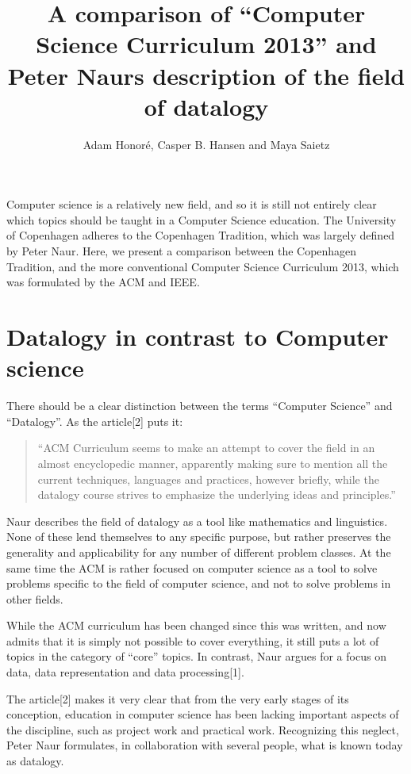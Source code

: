 \documentclass{article}
\title{A comparison of “Computer Science Curriculum 2013” and Peter Naurs description of the field of datalogy}
\author{Adam Honoré, Casper B. Hansen and Maya Saietz}
\begin{document}
\maketitle

\noindent Computer science is a relatively new field, and so it is still not entirely clear which topics should be taught in a
Computer Science education. The University of Copenhagen adheres to the Copenhagen Tradition, which was largely defined
by Peter Naur. Here, we present a comparison between the Copenhagen Tradition, and the more conventional Computer
Science Curriculum 2013, which was formulated by the ACM and IEEE.

\section{Datalogy in contrast to Computer science}
There should be a clear distinction between the terms ``Computer Science'' and ``Datalogy''. As the article[2] puts it:

\begin{quote}
    ``ACM Curriculum seems to make an attempt to cover the field in an almost encyclopedic manner, apparently making sure to
    mention all the current techniques, languages and practices, however briefly, while the datalogy course strives to
    emphasize the underlying ideas and principles.''
\end{quote}

Naur describes the field of datalogy as a tool like mathematics and linguistics. None of these lend themselves to any
specific purpose, but rather preserves the generality and applicability for any number of different problem classes. At
the same time the ACM is rather focused on computer science as a tool to solve problems specific to the field of
computer science, and not to solve problems in other fields.

While the ACM curriculum has been changed since this was written, and now admits that it is simply not possible to cover
everything, it still puts a lot of topics in the category of ``core'' topics. In contrast, Naur argues for a focus on
data, data representation and data processing[1].

The article[2] makes it very clear that from the very early stages of its conception, education in computer science has
been lacking important aspects of the discipline, such as project work and practical work. Recognizing this neglect,
Peter Naur formulates, in collaboration with several people, what is known today as datalogy.
\end{document}
